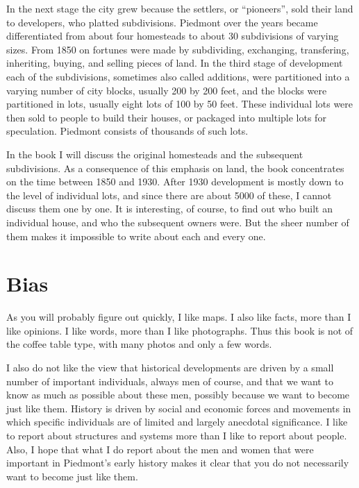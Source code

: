 \documentclass[
  12pt,
]{book}
\begin{document}
In the next stage the city grew because the settlers, or ``pioneers'', sold their land to developers, who platted subdivisions. Piedmont over the years became differentiated from about four homesteads to about 30 subdivisions of varying sizes. From 1850 on fortunes were made by subdividing, exchanging, transfering, inheriting, buying, and selling pieces of land. In the third stage of development each of the subdivisions, sometimes also called additions, were partitioned into a varying number of city blocks, usually 200 by 200 feet, and the blocks were partitioned in lots, usually eight lots of 100 by 50 feet. These individual lots were then sold to people to build their houses, or packaged into multiple lots for speculation. Piedmont consists of thousands of such lots.

In the book I will discuss the original homesteads and the subsequent subdivisions. As a consequence of this emphasis on land, the book concentrates on the time between 1850 and 1930. After 1930 development is mostly down to the level of individual lots, and since there are about 5000 of these, I cannot discuss them one by one. It is interesting, of course, to find out who built an individual house, and who the subsequent owners were. But the sheer number of them makes it impossible to write about each and every one.

\hypertarget{bias}{%
\section{Bias}\label{bias}}

As you will probably figure out quickly, I like maps. I also like facts, more than I like opinions. I like words, more than I like photographs. Thus this book is not of the coffee table type, with many photos and only a few words.

I also do not like the view that historical developments are driven by a small number of important individuals, always men of course, and that we want to know as much as possible about these men, possibly because we want to become just like them. History is driven by social and economic forces and movements in which specific individuals are of limited and largely anecdotal significance. I like to report about structures and systems more than I like to report about people. Also, I hope that what I do report about the men and women that were important in Piedmont's early history makes it clear that you do not necessarily want to become just like them.
\end{document}
